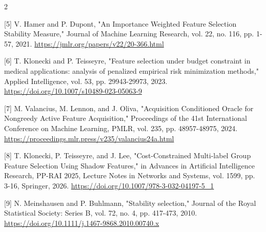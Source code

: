\documentclass[10pt,a4paper]{article}
\begin{document}
\begin{multicols}{2}
\begin{minipage}{\linewidth}{\fontsize{7}{8.2}\selectfont \begin{latin}[5] V. Hamer and P. Dupont, "An Importance Weighted Feature Selection Stability Measure," Journal of Machine Learning Research, vol. 22, no. 116, pp. 1-57, 2021. \url{https://jmlr.org/papers/v22/20-366.html}\end{latin}\par}\end{minipage}\par
\begin{minipage}{\linewidth}{\fontsize{7}{8.2}\selectfont \begin{latin}[6] T. Klonecki and P. Teisseyre, "Feature selection under budget constraint in medical applications: analysis of penalized empirical risk minimization methods," Applied Intelligence, vol. 53, pp. 29943-29973, 2023. \url{https://doi.org/10.1007/s10489-023-05063-9}\end{latin}\par}\end{minipage}\par
\begin{minipage}{\linewidth}{\fontsize{7}{8.2}\selectfont \begin{latin}[7] M. Valancius, M. Lennon, and J. Oliva, "Acquisition Conditioned Oracle for Nongreedy Active Feature Acquisition," Proceedings of the 41st International Conference on Machine Learning, PMLR, vol. 235, pp. 48957-48975, 2024. \url{https://proceedings.mlr.press/v235/valancius24a.html}\end{latin}\par}\end{minipage}\par
\begin{minipage}{\linewidth}{\fontsize{7}{8.2}\selectfont \begin{latin}[8] T. Klonecki, P. Teisseyre, and J. Lee, "Cost-Constrained Multi-label Group Feature Selection Using Shadow Features," in Advances in Artificial Intelligence Research, PP-RAI 2025, Lecture Notes in Networks and Systems, vol. 1599, pp. 3-16, Springer, 2026. \url{https://doi.org/10.1007/978-3-032-04197-5_1}\end{latin}\par}\end{minipage}\par
\begin{minipage}{\linewidth}{\fontsize{7}{8.2}\selectfont \begin{latin}[9] N. Meinshausen and P. Buhlmann, "Stability selection," Journal of the Royal Statistical Society: Series B, vol. 72, no. 4, pp. 417-473, 2010. \url{https://doi.org/10.1111/j.1467-9868.2010.00740.x}\end{latin}\par}\end{minipage}\par

\end{multicols}
\end{document}
